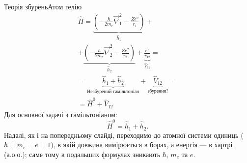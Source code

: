 \documentclass[10pt]{beamer}
\begin{document}
\begin{frame}{Теорія збурень}{Атом гелію}
	\begin{gather*}
		\hat H =
		\underbrace{\left( -\frac{\hbar}{2m_e}\vec{\nabla}^2_1 - \frac{Ze^2}{r_1} \right)}_{\hat h_1} + \\
		+
		\underbrace{\left( -\frac{\hbar}{2m_e}\vec{\nabla}^2_2 - \frac{Ze^2}{r_2} \right)}_{\hat h_2} +
		\underbrace{\frac{e^2}{r_{12}}}_{\hat V_{12}} = \\
		= \underbrace{\hat h_1 + \hat h_2}_\text{Незбурений гамільтоніан}
		+
		\underbrace{\hat V_{12}}_\text{збурення?}  = \\
		= \hat H^{0} + \hat V_{12}
	\end{gather*}
	Для основної задачі з гамільтоніаном:
	\begin{equation*}
		\hat{H}^0 = \hat{h}_1 + \hat{h}_2.
	\end{equation*}
	{\footnotesize Надалі, як і на попередньому слайді, переходимо до атомної системи одиниць ($\hbar = m_e = e = 1$), в якій довжина вимірюється в борах, а енергія --- в хартрі (а.о.о.); саме тому в подальших формулах зникають $\hbar$, $m_e$ та $e$.}
\end{frame}
\end{document}
